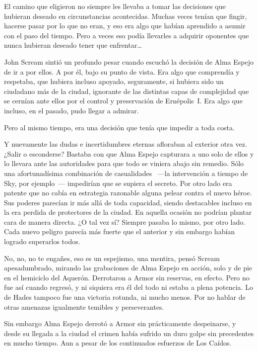 El camino que eligieron no siempre les llevaba a tomar las decisiones que hubieran deseado en circunstancias acontecidas. Muchas veces tenían que fingir, hacerse pasar por lo que no eran, y eso era algo que habían aprendido a asumir con el paso del tiempo.
Pero a veces eso podía llevarles a adquirir oponentes que nunca hubieran deseado tener que enfrentar\dots

\fancyparbreak
John Scream sintió un profundo pesar cuando escuchó la decisión de Alma Espejo de ir a por ellos. A por él, bajo su punto de vista. Era algo que comprendía y respetaba, que hubiera incluso apoyado, seguramente, si hubiera sido un ciudadano más de la ciudad, ignorante de las distintas capas de complejidad que se cernían ante ellos por el control y preservación de Ernépolis~I. Era algo que incluso, en el pasado, pudo llegar a admirar.

Pero al mismo tiempo, era una decisión que tenía que impedir a toda costa.

Y nuevamente las dudas e incertidumbres eternas afloraban al exterior otra vez. ¿Salir o esconderse? Bastaba con que Alma Espejo capturara a uno solo de ellos y lo llevara ante las autoridades para que todo se viniera abajo sin remedio. Sólo una afortunadísima combinación de casualidades ~---la intervención a tiempo de Sky, por ejemplo~--- impedirían que se supiera el secreto. Por otro lado era patente que no cabía en estrategia razonable alguna pelear contra el nuevo héroe. Sus poderes parecían ir más allá de toda capacidad, siendo destacables incluso en la era perdida de protectores de la ciudad. En aquella ocasión no podrían plantar cara de manera directa. ¿O tal vez sí? Siempre pasaba lo mismo, por otro lado. Cada nuevo peligro parecía más fuerte que el anterior y sin embargo habían logrado superarlos todos.

No, no, no te engañes, eso es un espejismo, una mentira, pensó Scream apesadumbrado, mirando las grabaciones de Alma Espejo en acción, solo y de pie en el hemiciclo del Aquerón. Derrotaron a Armor sin reservas, en efecto. Pero no fue así cuando regresó, y ni siquiera era él del todo ni estaba a plena potencia. Lo de Hades tampoco fue una victoria rotunda, ni mucho menos. Por no hablar de otras amenazas igualmente temibles y perseverantes.

Sin embargo Alma Espejo derrotó a Armor sin prácticamente despeinarse, y desde su llegada a la ciudad el crimen había sufrido un duro golpe sin precedentes en mucho tiempo. Aun a pesar de los continuados esfuerzos de Los Caídos.

